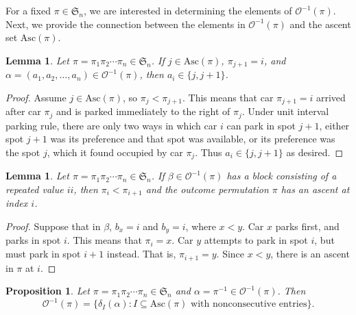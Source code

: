 \documentclass[11pt,reqno]{amsart}
\newcommand{\Asc}{\mathrm{Asc}}
\newcommand{\Out}{\mathcal{O}}
\newcommand{\Sym}{\mathfrak{S}}
\newtheorem{proposition}[rethm]{Proposition}
\newtheorem{lemma}[rethm]{Lemma}
\begin{document}
For a fixed $\pi\in\Sym_n$, we are interested in determining the elements of $\Out^{-1}(\pi)$. 
Next, we provide the connection between the elements in $\Out^{-1}(\pi)$ and the ascent set $\Asc(\pi)$.

\begin{lemma}
    Let $\pi=\pi_1\pi_2\cdots\pi_n\in\Sym_n$.
    If $j\in\Asc(\pi)$, $\pi_{j+1}=i$, and $\alpha=(a_1,a_2,\ldots,a_n)\in\Out^{-1}(\pi)$, then $a_{i}\in\{j,j+1\}$.
\end{lemma}
\begin{proof}
Assume $j\in\Asc(\pi)$, so $\pi_j<\pi_{j+1}$. 
This means that car $\pi_{j+1}=i$ arrived after car $\pi_j$ and is parked immediately to the right of $\pi_{j}$. Under unit interval parking rule, there are only two ways in which car $i$ can park in spot $j+1$, either spot $j+1$ was its preference and that spot was available, or its preference was the spot $j$, which it found occupied by car $\pi_j$. 
Thus $a_i\in \{j,j+1\}$ as desired.
\end{proof}

\begin{lemma}\label{lem:ascent in pi}
Let $\pi=\pi_1\pi_2\cdots\pi_n\in\Sym_n$.
    If $\beta\in\Out^{-1}(\pi)$ has a block consisting of a repeated value $ii$, then $\pi_i<\pi_{i+1}$ and the outcome permutation $\pi$ has an ascent at index $i$.
\end{lemma}

\begin{proof}
    Suppose that in $\beta$, $b_x=i$ and $b_y=i$, where $x<y$. Car $x$ parks first, and parks in spot $i$. This means that $\pi_i=x$. Car $y$ attempts to park in spot $i$, but must park in spot $i+1$ instead. That is, $\pi_{i+1}=y$. Since $x<y$, there is an ascent in $\pi$ at $i$.
\end{proof}


\begin{proposition}\label{prop:fiberascents}
Let $\pi=\pi_1\pi_2\cdots\pi_n\in\Sym_n$ and $\alpha=\pi^{-1}\in\Out^{-1}(\pi)$. 
    Then \[\Out^{-1}(\pi)=\{\delta_I(\alpha): I\subseteq \Asc(\pi) \mbox{ with nonconsecutive entries}\}.\]
\end{proposition}
\end{document}
